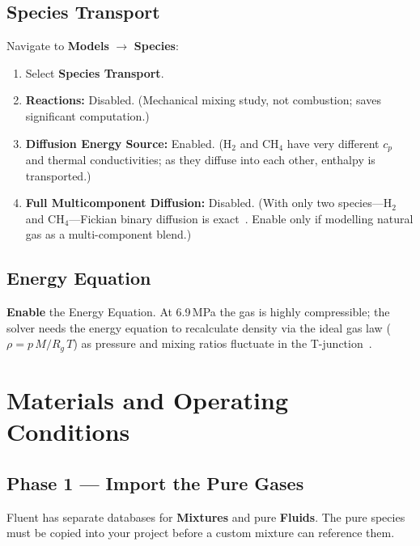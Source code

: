 \documentclass[12pt,a4paper]{report}
\begin{document}
\section{Species Transport}

Navigate to \textbf{Models} $\rightarrow$ \textbf{Species}:

\begin{enumerate}
  \item Select \textbf{Species Transport}.
  \item \textbf{Reactions:} Disabled.  \quad(Mechanical mixing study, not
        combustion; saves significant computation.)
  \item \textbf{Diffusion Energy Source:} Enabled.  \quad(H$_2$ and CH$_4$
        have very different $c_p$ and thermal conductivities; as they
        diffuse into each other, enthalpy is transported.)
  \item \textbf{Full Multicomponent Diffusion:} Disabled.  \quad(With only
        two species---H$_2$ and CH$_4$---Fickian binary diffusion is
        exact~\cite{Poling2001}.  Enable only if modelling natural gas as
        a multi-component blend.)
\end{enumerate}

\section{Energy Equation}

\textbf{Enable} the Energy Equation.  At 6.9\,MPa the gas is highly
compressible; the solver needs the energy equation to recalculate
density via the ideal gas law ($\rho = p\,M / R_g\,T$) as pressure and
mixing ratios fluctuate in the T-junction~\cite{ANSYSFluent2024}.


\chapter{Materials and Operating Conditions}
\label{ch:materials}

\section{Phase 1 --- Import the Pure Gases}

Fluent has separate databases for \textbf{Mixtures} and pure
\textbf{Fluids}.  The pure species must be copied into your project
before a custom mixture can reference them.
\end{document}
